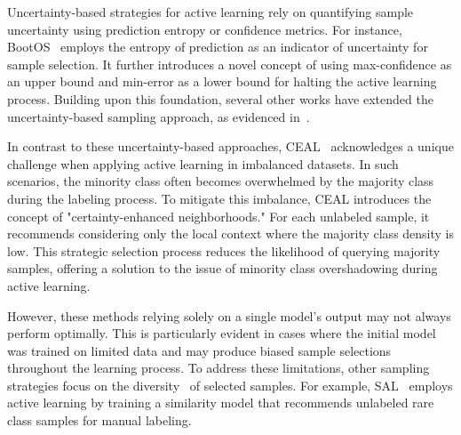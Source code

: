 Uncertainty-based strategies for active learning rely on quantifying sample uncertainty using prediction entropy or confidence metrics. For instance, BootOS~\cite{zhu2007active} employs the entropy of prediction as an indicator of uncertainty for sample selection. It further introduces a novel concept of using max-confidence as an upper bound and min-error as a lower bound for halting the active learning process. Building upon this foundation, several other works have extended the uncertainty-based sampling approach, as evidenced in~\cite{aggarwal2021minority, liu2021comprehensive, dong2020cost, jin2022deep}.

In contrast to these uncertainty-based approaches, CEAL~\cite{fu2011certainty} acknowledges a unique challenge when applying active learning in imbalanced datasets. In such scenarios, the minority class often becomes overwhelmed by the majority class during the labeling process. To mitigate this imbalance, CEAL introduces the concept of "certainty-enhanced neighborhoods." For each unlabeled sample, it recommends considering only the local context where the majority class density is low. This strategic selection process reduces the likelihood of querying majority samples, offering a solution to the issue of minority class overshadowing during active learning.

However, these methods relying solely on a single model's output may not always perform optimally. This is particularly evident in cases where the initial model was trained on limited data and may produce biased sample selections throughout the learning process. To address these limitations, other sampling strategies focus on the diversity~\cite{8595005, dong2020cost, aggarwal2021minority} of selected samples. For example, SAL~\cite{8595005} employs active learning by training a similarity model that recommends unlabeled rare class samples for manual labeling.

